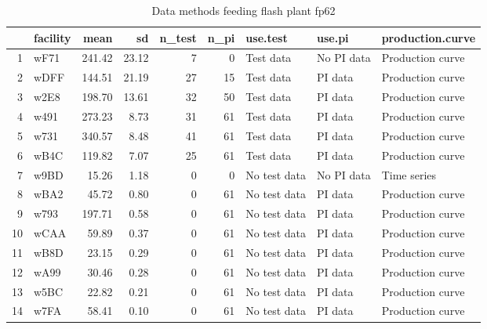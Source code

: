 \begin{table}[H]
\centering
\begin{tabular}{rlrrrrlll}
  \hline
 & facility & mean & sd & n\_test & n\_pi & use.test & use.pi & production.curve \\ 
  \hline
1 & wF71 & 241.42 & 23.12 &   7 &   0 & Test data & No PI data & Production curve \\ 
  2 & wDFF & 144.51 & 21.19 &  27 &  15 & Test data & PI data & Production curve \\ 
  3 & w2E8 & 198.70 & 13.61 &  32 &  50 & Test data & PI data & Production curve \\ 
  4 & w491 & 273.23 & 8.73 &  31 &  61 & Test data & PI data & Production curve \\ 
  5 & w731 & 340.57 & 8.48 &  41 &  61 & Test data & PI data & Production curve \\ 
  6 & wB4C & 119.82 & 7.07 &  25 &  61 & Test data & PI data & Production curve \\ 
  7 & w9BD & 15.26 & 1.18 &   0 &   0 & No test data & No PI data & Time series \\ 
  8 & wBA2 & 45.72 & 0.80 &   0 &  61 & No test data & PI data & Production curve \\ 
  9 & w793 & 197.71 & 0.58 &   0 &  61 & No test data & PI data & Production curve \\ 
  10 & wCAA & 59.89 & 0.37 &   0 &  61 & No test data & PI data & Production curve \\ 
  11 & wB8D & 23.15 & 0.29 &   0 &  61 & No test data & PI data & Production curve \\ 
  12 & wA99 & 30.46 & 0.28 &   0 &  61 & No test data & PI data & Production curve \\ 
  13 & w5BC & 22.82 & 0.21 &   0 &  61 & No test data & PI data & Production curve \\ 
  14 & w7FA & 58.41 & 0.10 &   0 &  61 & No test data & PI data & Production curve \\ 
   \hline
\end{tabular}
\caption{Data methods feeding flash plant fp62} 
\label{tab:well_summaries_fp15}
\end{table}
